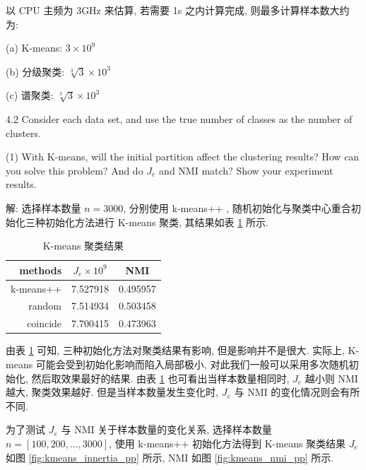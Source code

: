 \documentclass{article}
\begin{document}
以 CPU 主频为 3GHz 来估算, 若需要 1s 之内计算完成, 则最多计算样本数大约为:

(a) K-means: $3\times10^9$

(b) 分级聚类: $\sqrt[3]{3}\times10^3$

(c) 谱聚类: $\sqrt[3]{3}\times10^3$

4.2 Consider each data set, and use the true number of classes as the number of clusters.

(1) With K-means, will the initial partition affect the clustering results? How can you solve this problem? And do $J_{e}$ and NMI match? Show your experiment results.

解: 选择样本数量 $n=3000$, 分别使用 k-means++ \cite{kmeans}, 随机初始化与聚类中心重合初始化三种初始化方法进行 K-means 聚类, 其结果如表 \ref{tab:kmeans_initial} 所示.

\begin{table}[htbp]
  \centering
  \caption{K-means 聚类结果}
  \label{tab:kmeans_initial}
  \begin{tabular}{rcc}
    \toprule
    methods & $J_e\times10^{9}$ & NMI \\
    \midrule
    k-means++ & 7.527918 & 0.495957 \\
    random & 7.514934 & 0.503458 \\ 
    coincide & 7.700415 & 0.473963 \\
    \bottomrule
  \end{tabular}
\end{table}

由表 \ref{tab:kmeans_initial} 可知, 三种初始化方法对聚类结果有影响, 但是影响并不是很大. 实际上, K-means 可能会受到初始化影响而陷入局部极小, 对此我们一般可以采用多次随机初始化, 然后取效果最好的结果. 由表 \ref{tab:kmeans_initial} 也可看出当样本数量相同时, $J_e$ 越小则 NMI 越大, 聚类效果越好. 但是当样本数量发生变化时, $J_e$ 与 NMI 的变化情况则会有所不同.

为了测试 $J_e$ 与 NMI 关于样本数量的变化关系, 选择样本数量 $n=[100,200,\dots,3000]$, 使用 k-means++ 初始化方法得到 K-means 聚类结果 $J_e$ 如图 \ref{fig:kmeans_innertia_pp} 所示, NMI 如图 \ref{fig:kmeans_nmi_pp} 所示.
\end{document}
